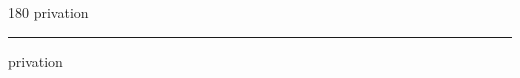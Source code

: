 
\begin{frame}
\begin{center}
\begin{turn}{180}
{\fontsize{2.5cm}{1em}\selectfont privation}
\end{turn}
\vspace{1em}\par  
\hrule
\vspace{1em}\par  
{\fontsize{2.5cm}{1em}\selectfont privation}
\end{center}
\end{frame}
